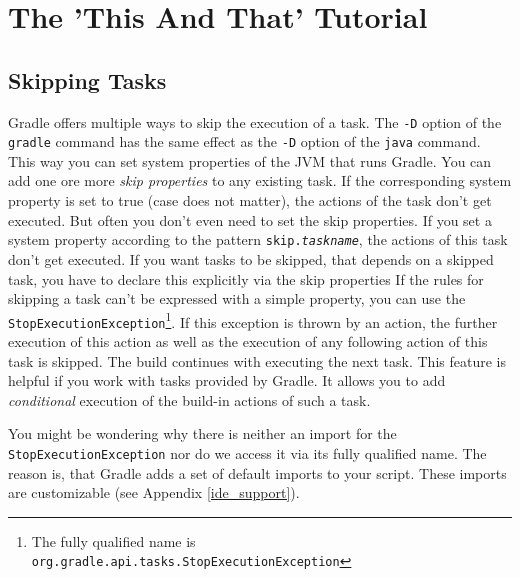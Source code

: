 \chapter{The 'This And That' Tutorial} %
\label{cha:the_this_and_that_tutorial}
\section{Skipping Tasks}
Gradle offers multiple ways to skip the execution of a task.
The \texttt{-D} option of the \texttt{gradle} command has the same effect as the \texttt{-D} option of the \texttt{java} command. This way you can set system properties of the JVM that runs Gradle. You can add one ore more \emph{skip properties} to any existing task. If the corresponding system property is set to true (case does not matter), the actions of the task don't get executed.
But often you don't even need to set the skip properties. If you set a system property according to the pattern \texttt{skip.\emph{taskname}}, the actions of this task don't get executed.
If you want tasks to be skipped, that depends on a skipped task, you have to declare this explicitly via the skip properties
%
If the rules for skipping a task can't be expressed with a simple property, you can use the \texttt{StopExecutionException}\footnote{The fully qualified name is \texttt{org.gradle.api.tasks.StopExecutionException}}. If this exception is thrown by an action, the further execution of this action as well as the execution of any following action of this task is skipped. The build continues with executing the next task.
%
This feature is helpful if you work with tasks provided by Gradle. It allows you to add \emph{conditional} execution of the build-in actions of such a task. 

You might be wondering why there is neither an import for the \texttt{StopExecutionException} nor do we access it via its fully qualified name. The reason is, that Gradle adds a set of default imports to your script. These imports are customizable (see Appendix \ref{ide_support}).

